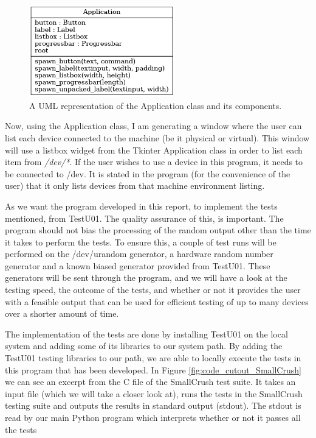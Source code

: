 \documentclass[]{final_report}
\begin{document}
\begin{figure}[h!]
\begin{center}
\includegraphics[height=4cm]{UMLclass}
\caption{A UML representation of the Application class and its components.}
\label{fig:UMLclass}
\end{center}
\end{figure}

\par{Now, using the Application class, I am generating a window where the user can list each device connected to the machine (be it physical or virtual). This window will use a listbox widget from the Tkinter Application class in order to list each item from \textit{/dev/*}.  If the user wishes to use a device in this program, it needs to be connected to /dev. It is stated in the program (for the convenience of the user) that it only lists devices from that machine environment listing.}

\par{As we want the program developed in this report, to implement the tests mentioned, from TestU01. The quality assurance of this, is important. The program should not bias the processing of the random output other than the time it takes to perform the tests. To ensure this, a couple of test runs will be performed on the /dev/urandom generator, a hardware random number generator and a known biased generator provided from TestU01. These generators will be sent through the program, and we will have a look at the testing speed, the outcome of the tests, and whether or not it provides the user with a feasible output that can be used for efficient testing of up to many devices over a shorter amount of time.}

\par{The implementation of the tests are done by installing TestU01 on the local system and adding some of its libraries to our system path. By adding the TestU01 testing libraries to our path, we are able to locally execute the tests in this program that has been developed. In Figure \ref{fig:code_cutout_SmallCrush} we can see an excerpt from the C file of the SmallCrush test suite. It takes an input file (which we will take a closer look at), runs the tests in the SmallCrush testing suite and outputs the results in standard output (stdout). The stdout is read by our main Python program which interprets whether or not it passes all the tests}
\end{document}
